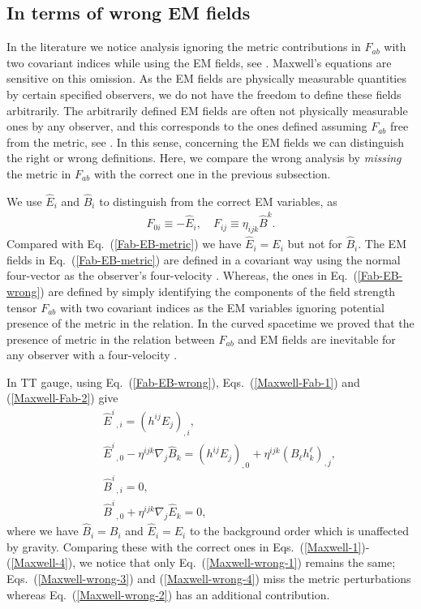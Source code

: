 \documentclass[twocolumn,amsmath,amssymb]{revtex4}
\newcommand{\bea}{\begin{eqnarray}}
\newcommand{\eea}{\end{eqnarray}}
\begin{document}
\subsection{In terms of wrong EM fields}
                                        \label{sec:wrong}

In the literature we notice analysis ignoring the metric contributions in $F_{ab}$ with two covariant indices while using the EM fields, see \cite{Berlin-2022, Domcke-2022, Palessandro-Rothman-2023}. Maxwell's equations are sensitive on this omission. As the EM fields are physically measurable quantities by certain specified observers, we do not have the freedom to define these fields arbitrarily. The arbitrarily defined EM fields are often not physically measurable ones by any observer, and this corresponds to the ones defined assuming $F_{ab}$ free from the metric, see \cite{EM-definition, Hwang-Noh-2023-EM-NL}. In this sense, concerning the EM fields we can distinguish the right or wrong definitions. Here, we compare the wrong analysis by {\it missing} the metric in $F_{ab}$ with the correct one in the previous subsection.

We use $\hat E_i$ and $\hat B_i$ to distinguish from the correct EM variables, as
\bea
   F_{0i} \equiv - \hat E_i, \quad
       F_{ij} \equiv \eta_{ijk} \hat B^k.
   \label{Fab-EB-wrong}
\eea
Compared with Eq.\ (\ref{Fab-EB-metric}) we have $\hat E_i = E_i$ but not for $\hat B_i$. The EM fields in Eq.\ (\ref{Fab-EB-metric}) are defined in a covariant way using the normal four-vector as the observer's four-velocity \cite{EM-definition}. Whereas, the ones in Eq.\ (\ref{Fab-EB-wrong}) are defined by simply identifying the components of the field strength tensor $F_{ab}$ with two covariant indices as the EM variables ignoring potential presence of the metric in the relation. In the curved spacetime we proved that the presence of metric in the relation between $F_{ab}$ and EM fields are inevitable for any observer with a four-velocity \cite{Hwang-Noh-2023-EM-NL}.

In TT gauge, using Eq.\ (\ref{Fab-EB-wrong}), Eqs.\ (\ref{Maxwell-Fab-1}) and (\ref{Maxwell-Fab-2}) give
\bea
   & & \hat E^i_{\;\;,i} = ( h^{ij} E_j )_{,i},
   \label{Maxwell-wrong-1} \\
   & & \hat E^i_{\;\;,0} - \eta^{ijk} \nabla_j \hat B_k
       = ( h^{ij} E_j )_{,0}
       + \eta^{ijk} ( B_\ell h^\ell_k )_{,j},
   \label{Maxwell-wrong-2} \\
   & & \hat B^i_{\;\;,i} = 0,
   \label{Maxwell-wrong-3} \\
   & & \hat B^i_{\;\;,0} + \eta^{ijk} \nabla_j \hat E_k
       = 0,
   \label{Maxwell-wrong-4}
\eea
where we have $\hat B_i = B_i$ and $\hat E_i = E_i$ to the background order which is unaffected by gravity.
Comparing these with the correct ones in Eqs.\ (\ref{Maxwell-1})-(\ref{Maxwell-4}), we notice that only Eq.\ (\ref{Maxwell-wrong-1}) remains the same; Eqs.\ (\ref{Maxwell-wrong-3}) and (\ref{Maxwell-wrong-4}) miss the metric perturbations whereas Eq.\ (\ref{Maxwell-wrong-2}) has an additional contribution.
\end{document}
